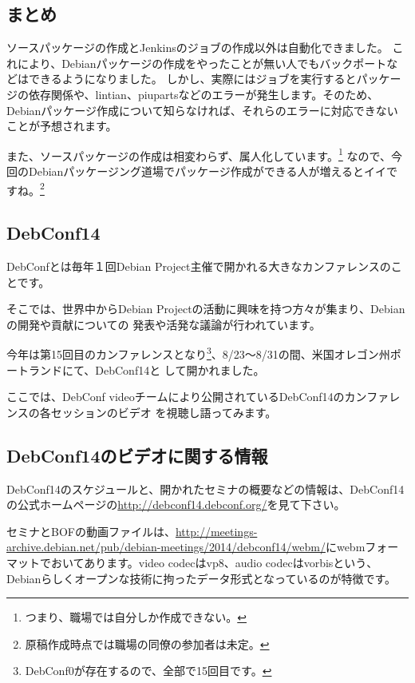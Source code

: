 \documentclass[mingoth,a4paper]{jsarticle}
\begin{document}
\subsection{まとめ}

ソースパッケージの作成とJenkinsのジョブの作成以外は自動化できました。
これにより、Debianパッケージの作成をやったことが無い人でもバックポートなどはできるようになりました。
しかし、実際にはジョブを実行するとパッケージの依存関係や、lintian、piupartsなどのエラーが発生します。そのため、Debianパッケージ作成について知らなければ、それらのエラーに対応できないことが予想されます。

また、ソースパッケージの作成は相変わらず、属人化しています。\footnote{つまり、職場では自分しか作成できない。}
なので、今回のDebianパッケージング道場でパッケージ作成ができる人が増えるとイイですね。\footnote{原稿作成時点では職場の同僚の参加者は未定。}


\subsection{DebConf14}

 DebConfとは毎年１回Debian Project主催で開かれる大きなカンファレンスのことです。

 そこでは、世界中からDebian Projectの活動に興味を持つ方々が集まり、Debianの開発や貢献についての
発表や活発な議論が行われています。

 今年は第15回目のカンファレンスとなり\footnote{DebConf0が存在するので、全部で15回目です。}、8/23〜8/31の間、米国オレゴン州ポートランドにて、DebConf14と
して開かれました。

 ここでは、DebConf videoチームにより公開されているDebConf14のカンファレンスの各セッションのビデオ
を視聴し語ってみます。

\subsection{DebConf14のビデオに関する情報}

 DebConf14のスケジュールと、開かれたセミナの概要などの情報は、DebConf14の公式ホームページの\url{http://debconf14.debconf.org/}を見て下さい。

 セミナとBOFの動画ファイルは、\url{http://meetings-archive.debian.net/pub/debian-meetings/2014/debconf14/webm/}にwebmフォーマットでおいてあります。video codecはvp8、audio codecはvorbisという、Debianらしくオープンな技術に拘ったデータ形式となっているのが特徴です。
\end{document}
